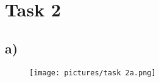 \section{Task 2}
\subsection{a)}
\begin{figure}[h!]
    \centering
    \texttt{[image: pictures/task 2a.png]}
\end{figure}


